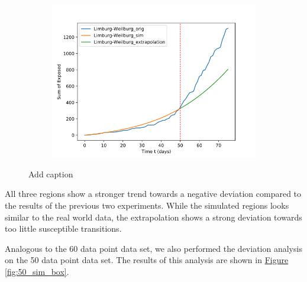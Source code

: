 \begin{figure}[h]
\begin{subfigure}[b]{0.3\textwidth}
		\includegraphics[width=\textwidth]{./figures/50d/10_Limburg-Weilburg.png}	
		\caption{}
	\end{subfigure}
	\caption{Add caption
		}
	\label{fig:50_sim_expl}
\end{figure}
All three regions show a stronger trend towards a negative deviation compared to the results of the previous two experiments.
While the simulated regions looks similar to the real world data, the extrapolation shows a strong deviation towards too little susceptible
transitions.\newline

Analogous to the 60 data point data set, we also performed the deviation analysis on the 50 data point data set. The results of this
analysis are shown in \hyperref[fig:50_sim_box]{Figure \ref*{fig:50_sim_box}}.\newline


